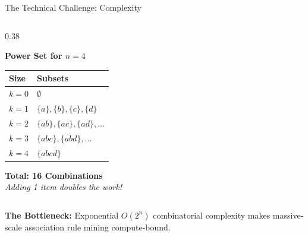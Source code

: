 \begin{frame}{The Technical Challenge: Complexity}
\begin{columns}[T, onlytextwidth]
        \begin{column}{0.38\textwidth}
            \centering
            \begin{minipage}{\textwidth}
                \centering
                \textbf{Power Set for $n=4$} \\
                \vspace{0.1cm}
                \renewcommand{\arraystretch}{1.1}
                \scriptsize
                \begin{tabular}{l l}
                    \hline
                    \textbf{Size} & \textbf{Subsets} \\ \hline
                    $k=0$ & $\emptyset$ \\
                    $k=1$ & $\{a\}, \{b\}, \{c\}, \{d\}$ \\
                    $k=2$ & $\{ab\}, \{ac\}, \{ad\}, \dots$ \\
                    $k=3$ & $\{abc\}, \{abd\}, \dots$ \\ 
                    $k=4$ & $\{abcd\}$ \\ \hline
                \end{tabular}
                \vspace{0.2cm}
                \small \textbf{Total: 16 Combinations} \\
                \scriptsize \textit{Adding 1 item doubles the work!}
            \end{minipage}
        \end{column}
    \end{columns}

    \vfill 
    \begin{alertblock}{}
        \centering \footnotesize
        \textbf{The Bottleneck:} Exponential $O(2^n)$ combinatorial complexity makes massive-scale association rule mining compute-bound.
    \end{alertblock}
\end{frame}

